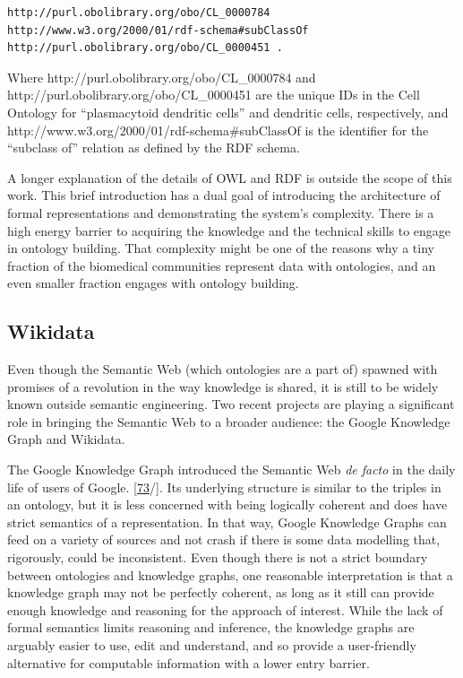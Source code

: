 \begin{verbatim}
http://purl.obolibrary.org/obo/CL_0000784  http://www.w3.org/2000/01/rdf-schema#subClassOf  http://purl.obolibrary.org/obo/CL_0000451 .
\end{verbatim}

Where http://purl.obolibrary.org/obo/CL\_0000784 and http://purl.obolibrary.org/obo/CL\_0000451 are the unique IDs in the Cell Ontology for ``plasmacytoid dendritic cells'' and dendritic cells, respectively, and http://www.w3.org/2000/01/rdf-schema\#subClassOf is the identifier for the ``subclass of'' relation as defined by the RDF schema.

A longer explanation of the details of OWL and RDF is outside the scope of this work.
This brief introduction has a dual goal of introducing the architecture of formal representations and demonstrating the system's complexity.
There is a high energy barrier to acquiring the knowledge and the technical skills to engage in ontology building.
That complexity might be one of the reasons why a tiny fraction of the biomedical communities represent data with ontologies, and an even smaller fraction engages with ontology building.

\hypertarget{wikidata}{%
\subsection{Wikidata}\label{wikidata}}

Even though the Semantic Web (which ontologies are a part of) spawned with promises of a revolution in the way knowledge is shared, it is still to be widely known outside semantic engineering. Two recent projects are playing a significant role in bringing the Semantic Web to a broader audience: the Google Knowledge Graph and Wikidata.

The Google Knowledge Graph introduced the Semantic Web \emph{de facto} in the daily life of users of Google. {[}\protect\hyperlink{ref-16mCkZC1r}{73}/{]}. Its underlying structure is similar to the triples in an ontology, but it is less concerned with being logically coherent and does have strict semantics of a representation.
In that way, Google Knowledge Graphs can feed on a variety of sources and not crash if there is some data modelling that, rigorously, could be inconsistent.
Even though there is not a strict boundary between ontologies and knowledge graphs, one reasonable interpretation is that a knowledge graph may not be perfectly coherent, as long as it still can provide enough knowledge and reasoning for the approach of interest.
While the lack of formal semantics limits reasoning and inference, the knowledge graphs are arguably easier to use, edit and understand, and so provide a user-friendly alternative for computable information with a lower entry barrier.

